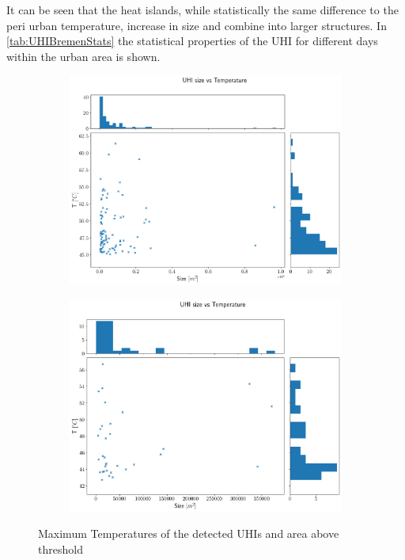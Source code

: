 \documentclass[12pt,a4paper, english,twoside]{scrartcl}
\begin{document}
      It can be seen that the heat islands, while statistically the same difference to the peri urban temperature, increase in size and combine into larger structures. 
      In \cref{tab:UHIBremenStats} the statistical properties of the \gls{UHI} for different days within the urban area is shown.
      \begin{figure}[!htbp]
        \centering
         \begin{subfigure}[b]{0.80\textwidth}
           \includegraphics[width=\textwidth]{img/sizeVsTempmean2019-06-29 00:00:00.png}
         \end{subfigure}

         \begin{subfigure}[b]{0.80\textwidth}
           \includegraphics[width=\textwidth]{img/sizeVsTempmean2022-06-21 00:00:00.png}
         \end{subfigure}
         \caption{Maximum Temperatures of the detected \glspl{UHI} and area above threshold}\label{fig:tempvssize}
      \end{figure}
\end{document}
